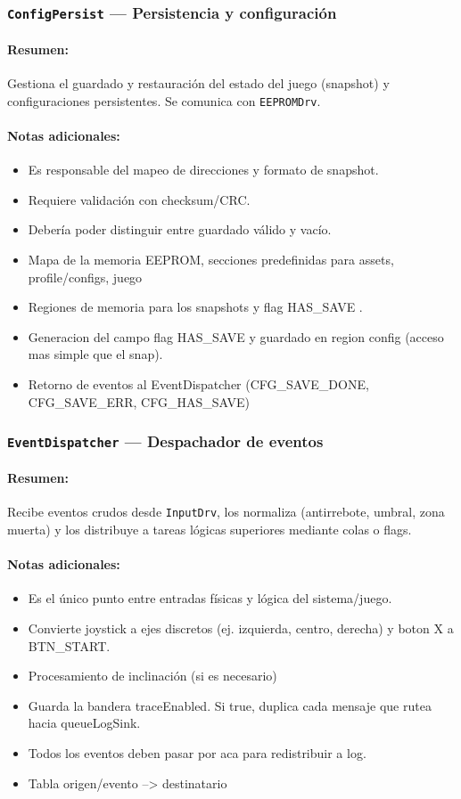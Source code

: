 \documentclass[11pt,a4paper]{article}
\begin{document}
\subsubsection{\texttt{ConfigPersist} — Persistencia y configuración}
\paragraph{Resumen:} Gestiona el guardado y restauración del estado del juego (snapshot) y configuraciones persistentes. Se comunica con \texttt{EEPROMDrv}.
\paragraph{Notas adicionales:}
\begin{itemize}
  \item Es responsable del mapeo de direcciones y formato de snapshot.
  \item Requiere validación con checksum/CRC.
  \item Debería poder distinguir entre guardado válido y vacío.
  \item Mapa de la memoria EEPROM, secciones predefinidas para assets, profile/configs, juego
  \item Regiones de memoria para los snapshots y flag HAS\_SAVE .
  \item Generacion del campo flag HAS\_SAVE y guardado en region config (acceso mas simple que el snap).
  \item Retorno de eventos al EventDispatcher (CFG\_SAVE\_DONE, CFG\_SAVE\_ERR, CFG\_HAS\_SAVE)
\end{itemize}

\subsubsection{\texttt{EventDispatcher} — Despachador de eventos}
\paragraph{Resumen:} Recibe eventos crudos desde \texttt{InputDrv}, los normaliza (antirrebote, umbral, zona muerta) y los distribuye a tareas lógicas superiores mediante colas o flags.
\paragraph{Notas adicionales:}
\begin{itemize}
  \item Es el único punto entre entradas físicas y lógica del sistema/juego.
  \item Convierte joystick a ejes discretos (ej. izquierda, centro, derecha) y boton X a BTN\_START. 
  \item Procesamiento de inclinación (si es necesario)
  \item Guarda la bandera traceEnabled. Si true, duplica cada mensaje que rutea hacia queueLogSink.
  \item Todos los eventos deben pasar por aca para redistribuir a log.
  \item Tabla origen/evento --> destinatario
\end{itemize}
\end{document}

